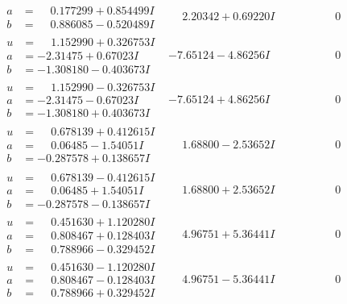 \documentclass[1p]{elsarticle_modified}
\theoremstyle{definition}
\begin{document}
$$\begin{array}{c|c|c}
\begin{aligned}
a &= \phantom{-}0.177299 + 0.854499 I \\
b &= \phantom{-}0.886085 - 0.520489 I\end{aligned}
 & \phantom{-}2.20342 + 0.69220 I & \phantom{-0.000000 } 0 \\ \hline\begin{aligned}
u &= \phantom{-}1.152990 + 0.326753 I \\
a &= -2.31475 + 0.67023 I \\
b &= -1.308180 - 0.403673 I\end{aligned}
 & -7.65124 - 4.86256 I & \phantom{-0.000000 } 0 \\ \hline\begin{aligned}
u &= \phantom{-}1.152990 - 0.326753 I \\
a &= -2.31475 - 0.67023 I \\
b &= -1.308180 + 0.403673 I\end{aligned}
 & -7.65124 + 4.86256 I & \phantom{-0.000000 } 0 \\ \hline\begin{aligned}
u &= \phantom{-}0.678139 + 0.412615 I \\
a &= \phantom{-}0.06485 - 1.54051 I \\
b &= -0.287578 + 0.138657 I\end{aligned}
 & \phantom{-}1.68800 - 2.53652 I & \phantom{-0.000000 } 0 \\ \hline\begin{aligned}
u &= \phantom{-}0.678139 - 0.412615 I \\
a &= \phantom{-}0.06485 + 1.54051 I \\
b &= -0.287578 - 0.138657 I\end{aligned}
 & \phantom{-}1.68800 + 2.53652 I & \phantom{-0.000000 } 0 \\ \hline\begin{aligned}
u &= \phantom{-}0.451630 + 1.120280 I \\
a &= \phantom{-}0.808467 + 0.128403 I \\
b &= \phantom{-}0.788966 - 0.329452 I\end{aligned}
 & \phantom{-}4.96751 + 5.36441 I & \phantom{-0.000000 } 0 \\ \hline\begin{aligned}
u &= \phantom{-}0.451630 - 1.120280 I \\
a &= \phantom{-}0.808467 - 0.128403 I \\
b &= \phantom{-}0.788966 + 0.329452 I\end{aligned}
 & \phantom{-}4.96751 - 5.36441 I & \phantom{-0.000000 } 0 \\ \hline\begin{aligned}

\end{aligned}
\end{array}$$
\end{document}
